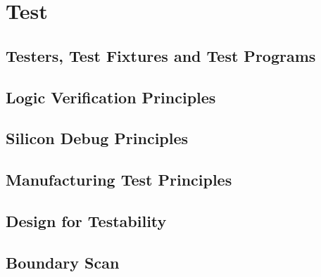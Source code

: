 \section{Test}

\subsection{Testers, Test Fixtures and Test Programs}

\subsection{Logic Verification Principles}

\subsection{Silicon Debug Principles}

\subsection{Manufacturing Test Principles}

\subsection{Design for Testability}

\subsection{Boundary Scan}
